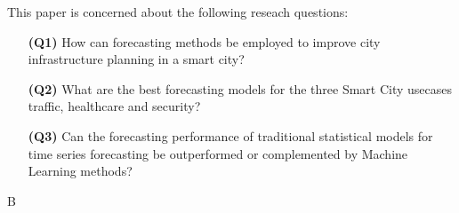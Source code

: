 This paper is concerned about the following reseach questions:

\begin{enumerate}
\item[\textbf{(Q1)}] How can forecasting methods be employed to improve city infrastructure planning in a smart city?
\item[\textbf{(Q2)}] What are the best forecasting models for the three Smart City usecases traffic, healthcare and security?
\item[\textbf{(Q3)}] Can the forecasting performance of traditional statistical models for time series forecasting be outperformed or complemented by Machine Learning methods?
\end{enumerate}

B